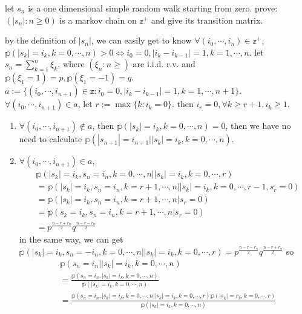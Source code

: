 \documentclass{ctexart}
\begin{document}
\begin{problem}\label{pro:4}
  let \(s_n\) is a one dimensional simple random walk starting from zero.
  prove: \((|s_n|: n \geq 0)\) is a markov chain on \(\mathbb{z}^+\) and give its transition matrix.
\end{problem}
\begin{solution}
  by the definition of \(|s_n|\), we can easily get to know
  \(\forall (i_0,\cdots,i_n) \in \mathbb{z}^{+}\), \(\mathbb{p}(|s_k|=i_k,k=0,\cdots,n)>0 \iff i_0=0,|i_k-i_{k-1}|=1, k=1,\cdots,n\).
  let \(s_n=\sum_{k=1}^n \xi_k\), where \((\xi_n:n \geq)\) are i.i.d. r.v. and \(\mathbb{p}(\xi_1=1)=p,\mathbb{p}(\xi_1=-1)=q\).
  \(a:=\{(i_0,\cdots,i_{n + 1}) \in \mathbb{z}: i_0=0,|i_k-i_{k- 1}|=1,k=1,\cdots,n + 1\}\).
  \(\forall (i_0,\cdots,i_{n + 1}) \in a\), let \(r :=\max \{k:i_k=0\}\).
  then \(i_r=0,\forall k \geq r + 1, i_k \geq 1\).
  \begin{enumerate}
    \item \(\forall (i_0,\cdots,i_{n + 1}) \notin a\), then \(\mathbb{p}(|s_k|=i_k,k=0,\cdots,n) =0\),
      then we have no need to calculate \(\mathbb{p}(|s_{n + 1}|=i_{n + 1} | |s_k|=i_k,k=0,\cdots,n)\).
    \item \(\forall(i_0,\cdots,i_{n + 1}) \in a\),
      \[
        \begin{aligned}
           & \mathbb{p}(|s_{k}|=i_k,s_n=i_n,k=0,\cdots,n| |s_k|=i_k,k=0,\cdots,r)
          \\   & =               \mathbb{p}(|s_{k}|=i_k,s_n=i_n,k=r + 1,\cdots,n| |s_k|=i_k,k=0,\cdots,r-1,s_r=0)
          \\   & =               \mathbb{p}(|s_{k}|=i_k,s_n=i_n,k=r +1,\cdots,n| s_r=0)
          \\   & =               \mathbb{p}(s_{k}=i_k,s_n=i_n,k=r +1,\cdots,n| s_r=0)
          \\&=p^{\frac{n-r + r_n}{2}}q^{\frac{n-r -r_n}{2}}
        \end{aligned}
      \]
      in the same way, we can get \(\mathbb{p}(|s_{k}|=i_k,s_n=-i_n,k=0,\cdots,n| |s_k|=i_k,k=0,\cdots,r)=p^{\frac{n-r - r_n}{2}}q^{\frac{n-r +r_n}{2}}\)
      so
      \[
        \begin{aligned}
           & \mathbb{p}(s_{n}=i_n| |s_k|=i_k,k=0,\cdots,n)
          \\   & =          \frac{\mathbb{p}(s_{n}=i_n,|s_k|=i_k,k=0,\cdots,n)}{\mathbb{p}(|s_k|=i_k,k=0,\cdots,n)}
          \\   & =          \frac{\mathbb{p}(s_{n}=i_n,|s_k|=i_k,k=0,\cdots,n||s_k|=i_k,k=0,\cdots,r)\mathbb{p}(|s_k|=r_k,k=0,\cdots,r)}{\mathbb{p}(|s_k|=i_k,k=0,\cdots,n)}

\end{aligned}\]
\end{enumerate}
\end{solution}
\end{document}
